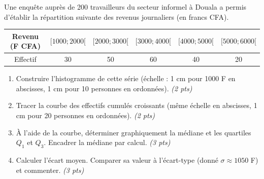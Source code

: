\documentclass[11pt]{article}
\begin{document}
\begin{exercice}
Une enquête auprès de 200 travailleurs du secteur informel à Douala a permis d'établir la répartition suivante des revenus journaliers (en francs CFA).
\begin{center}
\begin{tabular}{|c|c|c|c|c|c|}
\hline
Revenu (F CFA) & $[1000; 2000[$ & $[2000; 3000[$ & $[3000; 4000[$ & $[4000; 5000[$ & $[5000; 6000[$ \\
\hline
Effectif & 30 & 50 & 60 & 40 & 20 \\
\hline
\end{tabular}
\end{center}
\begin{enumerate}
    \item Construire l'histogramme de cette série (échelle : 1 cm pour 1000 F en abscisses, 1 cm pour 10 personnes en ordonnées). \textit{(2 pts)}
    \item Tracer la courbe des effectifs cumulés croissants (même échelle en abscisses, 1 cm pour 20 personnes en ordonnées). \textit{(2 pts)}
    \item À l'aide de la courbe, déterminer graphiquement la médiane et les quartiles $Q_1$ et $Q_3$. Encadrer la médiane par calcul. \textit{(3 pts)}
    \item Calculer l'écart moyen. Comparer sa valeur à l'écart-type (donné $\sigma \approx 1050$ F) et commenter. \textit{(3 pts)}
\end{enumerate}
\end{exercice}
\end{document}
